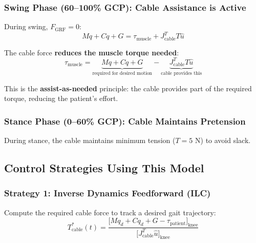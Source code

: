 \documentclass[11pt,a4paper]{article}
\newcommand{\vc}[1]{\bm{#1}}
\newcommand{\mat}[1]{\bm{#1}}
\newcommand{\dt}[1]{\dot{#1}}
\newcommand{\ddt}[1]{\ddot{#1}}
\def\vc#1{#1}%
\def\mat#1{#1}%
\def\dt#1{#1}%
\def\ddt#1{#1}%
\def\bm#1{#1}%
\begin{document}
\subsubsection*{Swing Phase (60--100\% GCP): Cable Assistance is Active}

During swing, $\vc{F}_{\text{GRF}} = \vc{0}$:
\begin{equation}
    \mat{M}\ddt{\vc{q}} + \vc{C}\dt{\vc{q}} + \vc{G}
    = \vc{\tau}_{\text{muscle}} + \vc{J}_{\text{cable}}^T T \hat{\vc{u}}
\end{equation}

The cable force \textbf{reduces the muscle torque needed}:
\begin{equation}
    \vc{\tau}_{\text{muscle}} = \underbrace{\mat{M}\ddt{\vc{q}} + \vc{C}\dt{\vc{q}} + \vc{G}}_{\text{required for desired motion}}
    - \underbrace{\vc{J}_{\text{cable}}^T T \hat{\vc{u}}}_{\text{cable provides this}}
    \label{eq:muscle_reduction}
\end{equation}

This is the \textbf{assist-as-needed} principle: the cable provides part
of the required torque, reducing the patient's effort.

\subsubsection*{Stance Phase (0--60\% GCP): Cable Maintains Pretension}

During stance, the cable maintains minimum tension ($T = 5$ N) to avoid slack.

\subsection{Control Strategies Using This Model}

\subsubsection{Strategy 1: Inverse Dynamics Feedforward (ILC)}

Compute the required cable force to track a desired gait trajectory:
\begin{equation}
    T_{\text{cable}}^{*}(t) = \frac{\bigl[\mat{M}\ddt{\vc{q}}_d + \vc{C}\dt{\vc{q}}_d + \vc{G} - \vc{\tau}_{\text{patient}}\bigr]_{\text{knee}}}
    {\bigl[\vc{J}_{\text{cable}}^T \hat{\vc{u}}\bigr]_{\text{knee}}}
    \label{eq:ilc_feedforward}
\end{equation}
\end{document}
